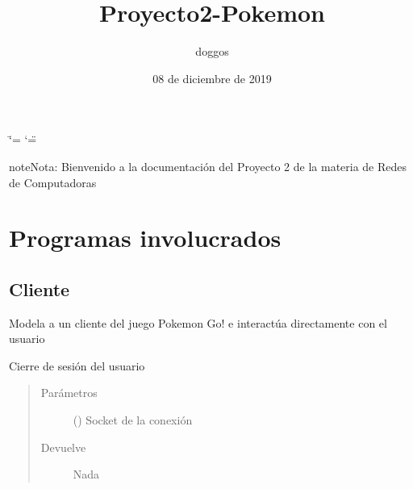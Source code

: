 \documentclass[letterpaper,10pt,spanish,openany,oneside]{sphinxmanual}
\title{Proyecto2-Pokemon}
\date{08 de diciembre de 2019}
\author{doggos}
\begin{document}
\ifdefined\shorthandoff
  \ifnum\catcode`\=\string=\active\shorthandoff{=}\fi
  \ifnum\catcode`\"=\active{}\fi
\fi

\pagestyle{empty}
\sphinxmaketitle
\pagestyle{plain}
\sphinxtableofcontents
\pagestyle{normal}
\label{\detokenize{index::doc}}


\begin{sphinxadmonition}{note}{Nota:}
Bienvenido a la documentación del Proyecto 2 de la materia de Redes de Computadoras
\end{sphinxadmonition}


\chapter{Programas involucrados}
\label{\detokenize{index:programas-involucrados}}

\section{Cliente}
\label{\detokenize{client:cliente}}\label{\detokenize{client::doc}}
Modela a un cliente del juego Pokemon Go! e interactúa directamente con el usuario

\label{\detokenize{client:module-client}}

\begin{fulllineitems}
\label{\detokenize{client:client.cerrarSesion}}
Cierre de sesión del usuario
\begin{quote}\begin{description}
\item[{Parámetros}] \leavevmode
{} () \textendash{} Socket de la conexión

\item[{Devuelve}] \leavevmode
Nada

\end{description}\end{quote}

\end{fulllineitems}

\end{document}
